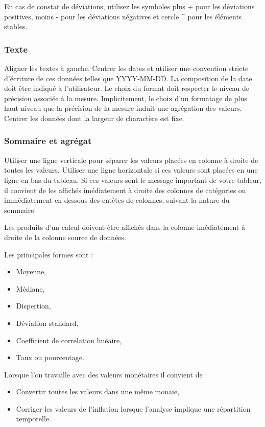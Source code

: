 \documentclass[a4paper,12pt]{article}
\begin{document}
\begin{multicols}{2}
En cas de constat de déviations, utilisez les symboles plus \og +\fg{} pour les déviations positives, moins \og -\fg{} pour les déviations négatives et cercle \og \^{}\fg{} pour les éléments stables. \autocite{andreaskrauseBestPracticesData2024}
\subsubsection*{Texte}
\label{sec:org74fdbe5}
Aligner les textes à gauche.
Centrer les dates et utiliser une convention stricte d'écriture de ces données telles que \og YYYY-MM-DD\fg{}. \autocite{ISO8601-1DateHeureRepresentations2019} La composition de la date doit être indiqué à l'utilisateur. Le choix du format doit respecter le niveau de précision associée à la mesure. Implicitement, le choix d'un formatage de plus haut niveau que la précision de la mesure induit une agrégation des valeurs.
Centrer les données dont la largeur de charactère est fixe.
\subsubsection*{Sommaire et agrégat}
\label{sec:org8c52bf9}
Utiliser une ligne verticale pour séparer les valeurs placées en colonne à droite de toutes les valeurs.
Utiliser une ligne horizontale si ces valeurs sont placées en une ligne en bas du tableau.
Si ces valeurs sont le message important de votre tableur, il convient de les affichés imédiatement à droite des colonnes de catégories ou immédiatement en dessous des entêtes de colonnes, suivant la nature du sommaire.

Les produits d'un calcul doivent être affichés dans la colonne imédiatement à droite de la colonne source de données.

Les principales formes sont :
\begin{itemize}
\item Moyenne,
\item Médiane,
\item Dispertion,
\item Déviation standard,
\item Coefficient de correlation linéaire,
\item Taux ou pourcentage.
\end{itemize}

Lorsque l'on travaille avec des valeurs monétaires il convient de :
\begin{itemize}
\item Convertir toutes les valeurs dans une même monaie,
\item Corriger les valeurs de l'inflation lorsque l'analyse implique une répartition temporelle.
\end{itemize}

\end{multicols}
\end{document}
